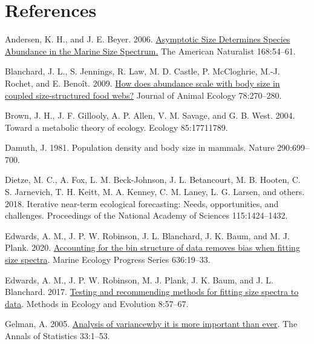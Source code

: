 \documentclass[
  12pt,
]{article}
\newlength{\cslhangindent}
\newlength{\cslentryspacingunit} %
\newenvironment{CSLReferences}[2] %
 {%
  \setlength{\parindent}{0pt}
  \ifodd #1
  \let\oldpar\par
  \def\par{\hangindent=\cslhangindent\oldpar}
  \fi
  \setlength{\parskip}{#2\cslentryspacingunit}
 }%
 {}
\numberwithin{equation}
\begin{document}
\hypertarget{references}{%
\section{References}\label{references}}

\hypertarget{refs}{}
\begin{CSLReferences}{1}{0}
\leavevmode{}%
Andersen, K. H., and J. E. Beyer. 2006.
\href{https://doi.org/10.1086/504849}{Asymptotic {Size Determines
Species Abundance} in the {Marine Size Spectrum}.} The American
Naturalist 168:54--61.

\leavevmode{}%
Blanchard, J. L., S. Jennings, R. Law, M. D. Castle, P. McCloghrie,
M.-J. Rochet, and E. Benoît. 2009.
\href{https://doi.org/10.1111/j.1365-2656.2008.01466.x}{How does
abundance scale with body size in coupled size-structured food webs?}
Journal of Animal Ecology 78:270--280.

\leavevmode{}%
Brown, J. H., J. F. Gillooly, A. P. Allen, V. M. Savage, and G. B. West.
2004. Toward a metabolic theory of ecology. Ecology 85:17711789.

\leavevmode{}%
Damuth, J. 1981. Population density and body size in mammals. Nature
290:699--700.

\leavevmode{}%
Dietze, M. C., A. Fox, L. M. Beck-Johnson, J. L. Betancourt, M. B.
Hooten, C. S. Jarnevich, T. H. Keitt, M. A. Kenney, C. M. Laney, L. G.
Larsen, and others. 2018. Iterative near-term ecological forecasting:
Needs, opportunities, and challenges. Proceedings of the National
Academy of Sciences 115:1424--1432.

\leavevmode{}%
Edwards, A. M., J. P. W. Robinson, J. L. Blanchard, J. K. Baum, and M.
J. Plank. 2020. \href{https://doi.org/10.3354/meps13230}{Accounting for
the bin structure of data removes bias when fitting size spectra}.
Marine Ecology Progress Series 636:19--33.

\leavevmode{}%
Edwards, A. M., J. P. W. Robinson, M. J. Plank, J. K. Baum, and J. L.
Blanchard. 2017. \href{https://doi.org/10.1111/2041-210X.12641}{Testing
and recommending methods for fitting size spectra to data}. Methods in
Ecology and Evolution 8:57--67.

\leavevmode{}%
Gelman, A. 2005.
\href{https://doi.org/10.1214/009053604000001048}{Analysis of
variance\textemdash why it is more important than ever}. The Annals of
Statistics 33:1--53.


\end{CSLReferences}
\end{document}
